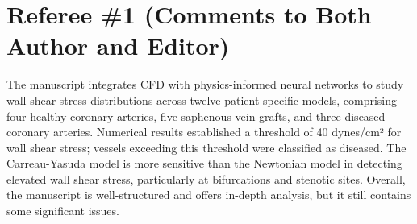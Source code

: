 \documentclass[11pt]{article}
\begin{document}
\section*{Referee \#1 (Comments to Both Author and Editor)}

The manuscript integrates CFD with physics-informed neural networks to study wall shear stress distributions across twelve patient-specific models, comprising four healthy coronary arteries, five saphenous vein grafts, and three diseased coronary arteries. Numerical results established a threshold of 40 dynes/cm² for wall shear stress; vessels exceeding this threshold were classified as diseased. The Carreau-Yasuda model is more sensitive than the Newtonian model in detecting elevated wall shear stress, particularly at bifurcations and stenotic sites. Overall, the manuscript is well-structured and offers in-depth analysis, but it still contains some significant issues.
\end{document}
